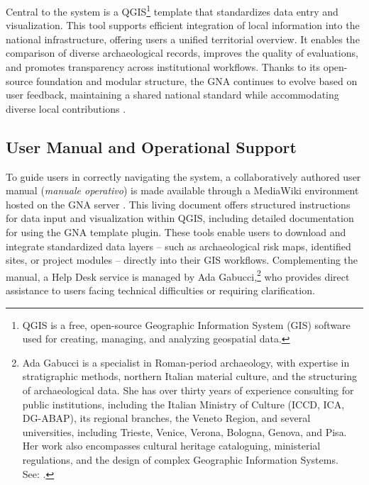 \begin{spacing}{1.5}
Central to the system is a QGIS\footnote{QGIS is a free, open-source Geographic Information System (GIS) software used for creating, managing, and analyzing geospatial data.} template that standardizes data entry and visualization. This tool supports efficient integration of local information into the national infrastructure, offering users a unified territorial overview. It enables the comparison of diverse archaeological records, improves the quality of evaluations, and promotes transparency across institutional workflows. Thanks to its open-source foundation and modular structure, the GNA continues to evolve based on user feedback, maintaining a shared national standard while accommodating diverse local contributions \citep{calandra_il_2023, boi_il_2023}.

\subsection{User Manual and Operational Support}
To guide users in correctly navigating the system, a collaboratively authored user manual (\textit{manuale operativo}) is made available through a MediaWiki environment hosted on the GNA server \citep{gna_wiki_2024}. This living document offers structured instructions for data input and visualization within QGIS, including detailed documentation for using the GNA template plugin. These tools enable users to download and integrate standardized data layers -- such as archaeological risk maps, identified sites, or project modules -- directly into their GIS workflows. Complementing the manual, a Help Desk service is managed by Ada Gabucci,\footnote{Ada Gabucci is a specialist in Roman-period archaeology, with expertise in stratigraphic methods, northern Italian material culture, and the structuring of archaeological data. She has over thirty years of experience consulting for public institutions, including the Italian Ministry of Culture (ICCD, ICA, DG-ABAP), its regional branches, the Veneto Region, and several universities, including Trieste, Venice, Verona, Bologna, Genova, and Pisa. Her work also encompasses cultural heritage cataloguing, ministerial regulations, and the design of complex Geographic Information Systems.\\See: \textcolor{teal}{}.\nocite{noauthor_ada_2025}} who provides direct assistance to users facing technical difficulties or requiring clarification.


\end{spacing}
